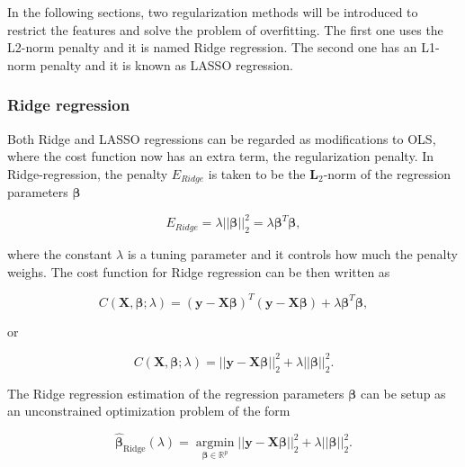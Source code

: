 \documentclass[a4paper]{article}
\begin{document}
In the following sections, two regularization methods will be introduced to restrict the features and solve the problem of overfitting. The first one uses the L2-norm penalty and it is named Ridge regression. The second one has an L1-norm penalty and it is known as LASSO regression.

\subsubsection{Ridge regression}

Both Ridge and LASSO regressions can be regarded as modifications to OLS, where the cost function now has an extra term, the regularization penalty. In Ridge-regression, the penalty $E_{Ridge}$ is taken to be the $\mathbf{L}_2$-norm of the regression parameters $\boldsymbol{\beta}$


\begin{equation}
    E_{Ridge}= \lambda ||\boldsymbol{\beta}||_2^2 = \lambda \boldsymbol{\beta}^T \boldsymbol{\beta},
\end{equation}


where the constant $\lambda$ is a tuning parameter and it controls how much the penalty weighs. The cost function for Ridge regression can be then written as


\begin{equation}
    C(\mathbf{X},\boldsymbol{\beta};\lambda)=(\mathbf{y}-\mathbf{X}\boldsymbol{\beta})^T(\mathbf{y}-\mathbf{X}\boldsymbol{\beta})+\lambda\boldsymbol{\beta}^T\boldsymbol{\beta},
    \label{cost-ridge}
\end{equation}


or


\begin{equation}
    C(\mathbf{X},\boldsymbol{\beta};\lambda)=
    \vert\vert\mathbf{y}-\mathbf{X}\boldsymbol{\beta}\vert\vert_2^2+\lambda ||\boldsymbol{\beta}||_2^2.
\end{equation}

The Ridge regression estimation of the regression parameters $\boldsymbol{\beta}$ can be setup as an unconstrained optimization problem of the form

\begin{equation}
    \hat{\boldsymbol{\beta}}_{\text{Ridge}}(\lambda)= \underset{\boldsymbol{\beta}\in\mathbb{R}^p}{\operatorname{argmin}} ||\mathbf{y}-\mathbf{X}\boldsymbol{\beta}||_2^2 + \lambda ||\boldsymbol{\beta}||_2^2.
    \label{ridge-opt}
\end{equation}
\end{document}
